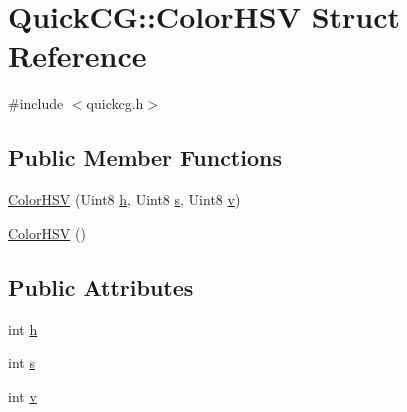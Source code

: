 \hypertarget{structQuickCG_1_1ColorHSV}{\section{Quick\-C\-G\-:\-:Color\-H\-S\-V Struct Reference}
\label{structQuickCG_1_1ColorHSV}
}


{\ttfamily \#include $<$quickcg.\-h$>$}

\subsection*{Public Member Functions}
\begin{DoxyCompactItemize}
\item 
\hyperlink{structQuickCG_1_1ColorHSV_a0b545ef3534166ba240de07f83722ea8}{Color\-H\-S\-V} (Uint8 \hyperlink{structQuickCG_1_1ColorHSV_acbf27d11c4aab9e11e140c0b2e3cab72}{h}, Uint8 \hyperlink{structQuickCG_1_1ColorHSV_a458b4a97b9351221f01245e11460d4db}{s}, Uint8 \hyperlink{structQuickCG_1_1ColorHSV_ab7c052e520eb5bdaa196568da3f015a1}{v})
\item 
\hyperlink{structQuickCG_1_1ColorHSV_aa8d81269f4bc7261260c0e56c94c3ab2}{Color\-H\-S\-V} ()
\end{DoxyCompactItemize}
\subsection*{Public Attributes}
\begin{DoxyCompactItemize}
\item 
int \hyperlink{structQuickCG_1_1ColorHSV_acbf27d11c4aab9e11e140c0b2e3cab72}{h}
\item 
int \hyperlink{structQuickCG_1_1ColorHSV_a458b4a97b9351221f01245e11460d4db}{s}
\item 
int \hyperlink{structQuickCG_1_1ColorHSV_ab7c052e520eb5bdaa196568da3f015a1}{v}
\end{DoxyCompactItemize}


